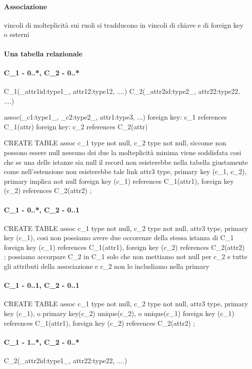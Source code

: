 \documentclass[12pt]{article}
\begin{document}
\paragraph{Associazione}
			vincoli di molteplicità sui ruoli si tradducono in vincoli di chiave e di foreign key o esterni
\paragraph{Una tabella relazionale}
\paragraph{C_1 - 0..*, C_2 - 0..*}
				C_1(_attr1{id}:type1_, attr12:type12, ....)
				C_2(_attr2{id}:type2_, attr22:type22, ....)

				assoc(_c1:type1_, _c2:type2_, attr1:type3, ...)
					foreign key: c_1 references C_1(attr)
					foreign key: c_2 references C_2(attr)
				
				CREATE TABLE assoc{
					c_1 type not null,
					c_2 type not null,
						siccome non possono essere null nessuno dei due la molteplicità minima viene soddisfata cosi che se una delle istanze sia null il record non esisterebbe nella 							tabella giustamente come nell'estensione non esisterebbe tale link
					attr3 type,
					primary key (c_1, c_2), primary implica not null
					foreign key (c_1) references C_1(attr1),
					foreign key (c_2) references C_2(attr2)
				};
\paragraph{C_1 - 0..*, C_2 - 0..1}
				CREATE TABLE assoc{
					c_1 type not null,
					c_2 type not null,
					attr3 type,
					primary key (c_1), cosi non possiamo avere due occorenze della stessa istanza di C_1
					foreign key (c_1) references C_1(attr1),
					foreign key (c_2) references C_2(attr2)
				};
				possiamo accorpare C_2 in C_1 solo che non mettiamo not null per c_2 e tutte gli attributi della associazione e c_2 non lo includiamo nella primary
\paragraph{C_1 - 0..1, C_2 - 0..1}
				CREATE TABLE assoc{
					c_1 type not null,
					c_2 type not null,
					attr3 type,
					primary key (c_1), o primary key(c_2)
					unique(c_2), o unique(c_1)
					foreign key (c_1) references C_1(attr1),
					foreign key (c_2) references C_2(attr2)
				};

\paragraph{C_1 - 1..*, C_2 - 0..*}
				C_2(_attr2{id}:type1_, attr22:type22, ....)
\end{document}
